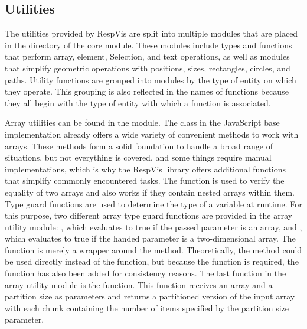 \subsection{Utilities}

The utilities provided by RespVis are split into multiple modules that are placed in the  directory of the core module.
These modules include types and functions that perform array, element, Selection, and text operations, as well as modules that simplify geometric operations with positions, sizes, rectangles, circles, and paths.
Utility functions are grouped into modules by the type of entity on which they operate.
This grouping is also reflected in the names of functions because they all begin with the type of entity with which a function is associated.

Array utilities can be found in the  module.
The  class in the JavaScript base implementation already offers a wide variety of convenient methods to work with arrays.
These methods form a solid foundation to handle a broad range of situations, but not everything is covered, and some things require manual implementations, which is why the RespVis library offers additional functions that simplify commonly encountered tasks.
The  function is used to verify the equality of two arrays and also works if they contain nested arrays within them.
Type guard functions are used to determine the type of a variable at runtime.
For this purpose, two different array type guard functions are provided in the array utility module: , which evaluates to true if the passed parameter is an array, and , which evaluates to true if the handed parameter is a two-dimensional array.
The  function is merely a wrapper around the  method.
Theoretically, the  method could be used directly instead of the  function, but because the  function is required, the  function has also been added for consistency reasons.
The last function in the array utility module is the  function.
This function receives an array and a partition size as parameters and returns a partitioned version of the input array with each chunk containing the number of items specified by the partition size parameter.


